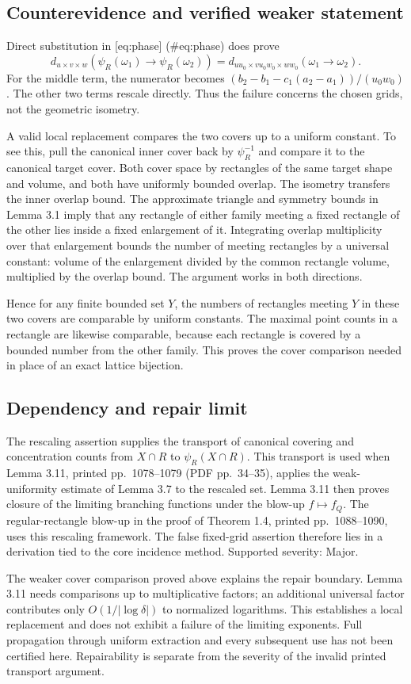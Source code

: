 \documentclass[10pt]{article}
\begin{document}
\subsection*{Counterevidence and verified weaker statement}
Direct substitution in [eq:phase] (\#eq:phase) does prove \[d_{u\times v\times w}(\psi_R(\omega_1)\to\psi_R(\omega_2))
=d_{uu_0\times vu_0w_0\times ww_0}(\omega_1\to\omega_2).\] For the middle term, the numerator becomes \((b_2-b_1-c_1(a_2-a_1))/(u_0w_0)\). The other two terms rescale directly. Thus the failure concerns the chosen grids, not the geometric isometry.\par
A valid local replacement compares the two covers up to a uniform constant. To see this, pull the canonical inner cover back by \(\psi_R^{-1}\) and compare it to the canonical target cover. Both cover space by rectangles of the same target shape and volume, and both have uniformly bounded overlap. The isometry transfers the inner overlap bound. The approximate triangle and symmetry bounds in Lemma 3.1 imply that any rectangle of either family meeting a fixed rectangle of the other lies inside a fixed enlargement of it. Integrating overlap multiplicity over that enlargement bounds the number of meeting rectangles by a universal constant: volume of the enlargement divided by the common rectangle volume, multiplied by the overlap bound. The argument works in both directions.\par
Hence for any finite bounded set \(Y\), the numbers of rectangles meeting \(Y\) in these two covers are comparable by uniform constants. The maximal point counts in a rectangle are likewise comparable, because each rectangle is covered by a bounded number from the other family. This proves the cover comparison needed in place of an exact lattice bijection.\par
\subsection*{Dependency and repair limit}
The rescaling assertion supplies the transport of canonical covering and concentration counts from \(X\cap R\) to \(\psi_R(X\cap R)\). This transport is used when Lemma 3.11, printed pp. 1078–1079 (PDF pp. 34–35), applies the weak-uniformity estimate of Lemma 3.7 to the rescaled set. Lemma 3.11 then proves closure of the limiting branching functions under the blow-up \(f\mapsto f_Q\). The regular-rectangle blow-up in the proof of Theorem 1.4, printed pp. 1088–1090, uses this rescaling framework. The false fixed-grid assertion therefore lies in a derivation tied to the core incidence method. Supported severity: Major.\par
The weaker cover comparison proved above explains the repair boundary. Lemma 3.11 needs comparisons up to multiplicative factors; an additional universal factor contributes only \(O(1/|\log\delta|)\) to normalized logarithms. This establishes a local replacement and does not exhibit a failure of the limiting exponents. Full propagation through uniform extraction and every subsequent use has not been certified here. Repairability is separate from the severity of the invalid printed transport argument.\par
\end{document}
